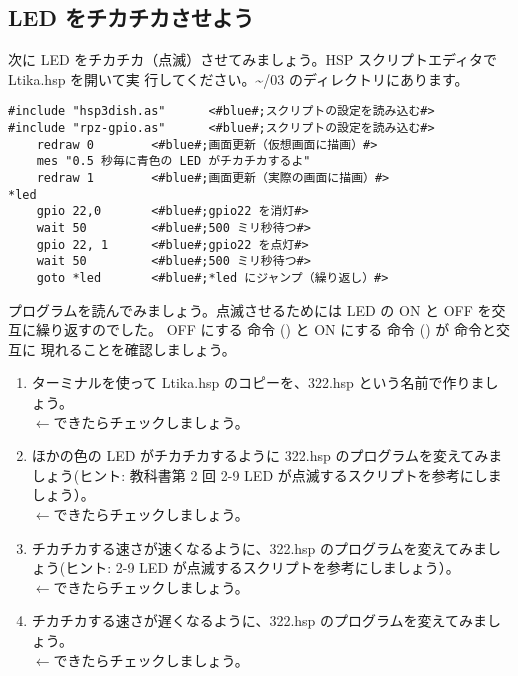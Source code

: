 \subsection{LED をチカチカさせよう}

次に LED をチカチカ（点滅）させてみましょう。HSP スクリプトエディタで Ltika.hsp を開いて実
行してください。\textasciitilde /03 のディレクトリにあります。\\

\begin{lstlisting}[caption=Ltika.hsp,label=Ltika.hsp]
#include "hsp3dish.as"		<#blue#;スクリプトの設定を読み込む#>
#include "rpz-gpio.as"		<#blue#;スクリプトの設定を読み込む#>
	redraw 0		<#blue#;画面更新（仮想画面に描画）#>
	mes "0.5 秒毎に青色の LED がチカチカするよ"
	redraw 1		<#blue#;画面更新（実際の画面に描画）#>
*led
	gpio 22,0		<#blue#;gpio22 を消灯#>
	wait 50 		<#blue#;500 ミリ秒待つ#>
	gpio 22, 1 		<#blue#;gpio22 を点灯#>
	wait 50 		<#blue#;500 ミリ秒待つ#>
	goto *led 		<#blue#;*led にジャンプ（繰り返し）#>
\end{lstlisting}

プログラムを読んでみましょう。点滅させるためには LED の ON と OFF を交互に繰り返すのでした。
OFF にする  命令 () と ON にする  命令 () が  命令と交互に
現れることを確認しましょう。\\

\begin{tcolorbox}[title=\useOmetoi]
\begin{enumerate}
\item ターミナルを使って Ltika.hsp のコピーを、322.hsp という名前で作りましょう。\\
\fbox{\phantom{白}} $\leftarrow$できたらチェックしましょう。
\item ほかの色の LED がチカチカするように 322.hsp のプログラムを変えてみましょう(ヒント:
教科書第 2 回 2-9 LED が点滅するスクリプトを参考にしましょう）。\\
\fbox{\phantom{白}} $\leftarrow$できたらチェックしましょう。
\item チカチカする速さが速くなるように、322.hsp のプログラムを変えてみましょう(ヒント: 2-9 
LED が点滅するスクリプトを参考にしましょう）。\\
\fbox{\phantom{白}} $\leftarrow$できたらチェックしましょう。
\item チカチカする速さが遅くなるように、322.hsp のプログラムを変えてみましょう。\\
\fbox{\phantom{白}} $\leftarrow$できたらチェックしましょう。
\end{enumerate}
\end{tcolorbox}
